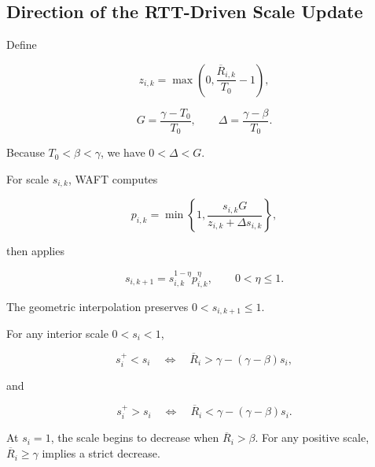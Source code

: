 \subsection{Direction of the RTT-Driven Scale Update}
\label{app:f-2}

Define

\begin{equation}
\label{eq:app-f-9}
z_{i,k}
=
\max\left(0,\frac{\overline R_{i,k}}{T_0}-1\right),
\end{equation}

\begin{equation}
\label{eq:app-f-10}
G=\frac{\gamma-T_0}{T_0},
\qquad
\Delta=\frac{\gamma-\beta}{T_0}.
\end{equation}

Because \(T_0<\beta<\gamma\), we have \(0<\Delta<G\).

For scale \(s_{i,k}\), WAFT computes

\begin{equation}
\label{eq:app-f-11}
p_{i,k}
=
\min\left\{
1,\frac{s_{i,k}G}{z_{i,k}+\Delta s_{i,k}}
\right\},
\end{equation}

then applies

\begin{equation}
\label{eq:app-f-12}
\boxed{
s_{i,k+1}
=
s_{i,k}^{1-\eta}p_{i,k}^{\eta},
\qquad 0<\eta\le1.
}
\end{equation}

The geometric interpolation preserves \(0<s_{i,k+1}\le1\).

\begin{lemma}
\label{lem:f-2}
For any interior scale \(0<s_i<1\),

\begin{equation}
\label{eq:app-f-13}
s_i^+<s_i
\quad\Longleftrightarrow\quad
\overline R_i>
\gamma-(\gamma-\beta)s_i,
\end{equation}

and

\begin{equation}
\label{eq:app-f-14}
s_i^+>s_i
\quad\Longleftrightarrow\quad
\overline R_i<
\gamma-(\gamma-\beta)s_i.
\end{equation}

At \(s_i=1\), the scale begins to decrease when \(\overline R_i>\beta\). For any positive scale, \(\overline R_i\ge\gamma\) implies a strict decrease.
\end{lemma}

